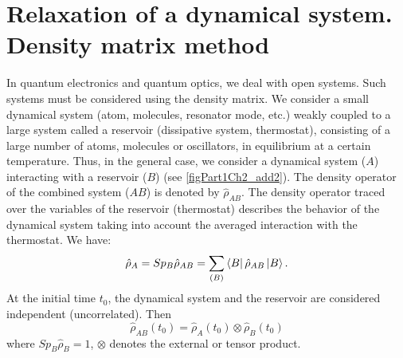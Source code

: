 \section{Relaxation of a dynamical system. Density matrix method}
In quantum electronics and quantum optics, we deal with open
systems. Such systems must be considered using
the density matrix. We consider a small dynamical system
(atom, molecules, resonator mode, etc.) weakly coupled to
a large system called a reservoir (dissipative
system, thermostat), consisting of a large number of atoms,
molecules or oscillators, in equilibrium at
a certain temperature. Thus, in the general case,
we consider a dynamical system ($A$) interacting with
a reservoir ($B$) (see \autoref{figPart1Ch2_add2}). The density operator
of the combined system ($AB$) is denoted by $\hat{\rho}_{AB}$.
The density operator traced over the variables of the reservoir (thermostat) 
describes the behavior of the dynamical system taking into account the averaged
interaction with the thermostat. We have:
\begin{equation}
\hat{\rho}_{A} = Sp_{B} \hat{\rho}_{AB} = 
\sum_{\left(B\right)}
\bra{B}\hat{\rho}_{AB}\ket{B}.
\end{equation}
At the initial time $t_0$, the dynamical system and the reservoir
are considered independent (uncorrelated). Then
\begin{equation}
\hat{\rho}_{AB}\left(t_0\right) = 
\hat{\rho}_{A}\left(t_0\right)
\otimes
\hat{\rho}_{B}\left(t_0\right)
\end{equation}
where $Sp_B \hat{\rho}_{B} = 1$, $\otimes$ denotes the external or
tensor product.  



